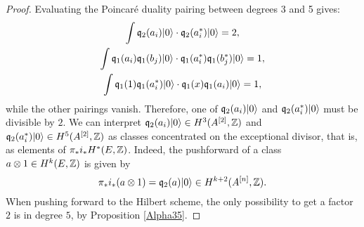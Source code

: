 \begin{proposition}
\begin{proof}
Evaluating the Poincar\'e duality pairing between degrees 3 and 5 gives:
\begin{gather*}
 \int \mathfrak{q}_2(a_i)|0\rangle \cdot \mathfrak{q}_2(a^*_i)|0\rangle = 2, \\
 \int \mathfrak{q}_1(a_i)\mathfrak{q}_1(b_j)|0\rangle \cdot  \mathfrak{q}_1(a^*_i)\mathfrak{q}_1(b^*_j)|0\rangle = 1, \\
 \int \mathfrak{q}_1(1)\mathfrak{q}_1(a^*_i)|0\rangle \cdot \mathfrak{q}_1(x)\mathfrak{q}_1(a_i)|0\rangle = 1,
\end{gather*}
while the other pairings vanish. Therefore, one of $\mathfrak{q}_2(a_i)|0\rangle$ and $\mathfrak{q}_2(a^*_i)|0\rangle$ must be divisible by $2$. 
We can interpret $\mathfrak{q}_2(a_i)|0\rangle\in H^3(A^{[2]},\mathbb{Z})$ and $\mathfrak{q}_2(a^*_i)|0\rangle\in H^5(A^{[2]},\mathbb{Z})$ as classes concentrated on the exceptional divisor, that is, as elements of $\pi_* i_*H^*(E,\mathbb{Z})$. Indeed,
the pushforward of a class $a\otimes 1 \in H^{k}(E,\mathbb{Z})$ is given by 
$$
\pi_* i_*(a\otimes 1) = \mathfrak{q}_2(a)|0\rangle \in H^{k+2}(A^{[n]},\mathbb{Z}).
$$
When pushing forward to the Hilbert scheme, the only possibility to get a factor $2$ is in degree $5$, by Proposition \ref{Alpha35}. 
\end{proof}

\end{proposition}
